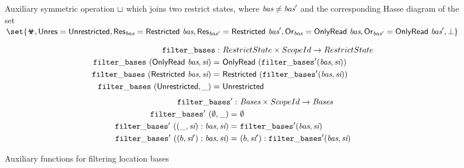 \begin{figure}[h]
\begin{minipage}{.45\textwidth}
\end{minipage}
\caption{Auxiliary symmetric operation $\mathrel{\sqcup}$ which joins two restrict states, where $\textit{bas} \neq \textit{bas}'$
            and the corresponding Hasse diagram of the set {\small $\set{\rsub, \unresabbr = \unrestricted, 
            \resabbr{\Basesvar} = \restricted{\Basesvar}, \resabbr{\Basesvar'} = \restricted{\Basesvar'},
            \orabbr{\Basesvar} = \onlyread{\Basesvar}, \orabbr{\Basesvar'} = \onlyread{\Basesvar'}, \bot}$} }
\label{fig:auxiliary-join}
\end{figure}

\begin{figure}[htp]
\begin{align*}
\filterbases                                      : & \ RestrictState \times ScopeId \rightarrow RestrictState \\
\filterbases \ (\onlyread{\Basesvar}, \Scopeidvar)   = & \ \onlyread{ (\filterbasesrec (\Basesvar, \Scopeidvar) ) } \\
\filterbases \ (\restricted{\Basesvar}, \Scopeidvar) = & \ \restricted{ (\filterbasesrec (\Basesvar, \Scopeidvar)) } \\
\filterbases \ (\unrestricted, \_)                       = & \ \unrestricted
\end{align*}
\begin{align*}
\filterbasesrec                                             : & \ \Bases \times ScopeId \rightarrow \Bases \\
\filterbasesrec \ (\emptyset, \_)                              = & \ \emptyset \\
\filterbasesrec \ ((\_, \Scopeidvar) : \Basesvar, \Scopeidvar) = & \ \filterbasesrec (\Basesvar, \Scopeidvar) \\
\filterbasesrec \ ((b, \Scopeidvar') : \Basesvar, \Scopeidvar) = & \ (b, \Scopeidvar') : \filterbasesrec (\Basesvar, \Scopeidvar)
\end{align*}
\caption{Auxiliary functions for filtering location bases}
\label{fig:auxiliary-bases-filtering}
\end{figure}

